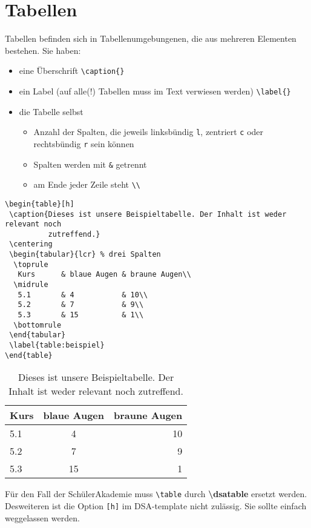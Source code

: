 \section{Tabellen}
Tabellen befinden sich in Tabellenumgebungenen, die
aus mehreren Elementen bestehen. Sie haben:

\begin{itemize}
 \item eine Überschrift \lstinline$\caption{}$
 \item ein Label (auf alle(!) Tabellen muss im Text verwiesen werden)
       \lstinline$\label{}$
 \item die Tabelle selbst
 \begin{itemize}
  \item Anzahl der Spalten, die jeweils linksbündig \lstinline$l$, zentriert
        \lstinline$c$ oder rechtsbündig \lstinline$r$ sein können
  \item Spalten werden mit \lstinline$&$ getrennt
  \item am Ende jeder Zeile steht \lstinline$\\$
 \end{itemize}
\end{itemize}

\begin{lstlisting}
\begin{table}[h]
 \caption{Dieses ist unsere Beispieltabelle. Der Inhalt ist weder relevant noch
          zutreffend.}
 \centering
 \begin{tabular}{lcr} % drei Spalten
  \toprule
   Kurs      & blaue Augen & braune Augen\\
  \midrule
   5.1       & 4           & 10\\
   5.2       & 7           & 9\\
   5.3       & 15          & 1\\
  \bottomrule
 \end{tabular}
 \label{table:beispiel}
\end{table}
\end{lstlisting}

\begin{table}[h]
 \caption{Dieses ist unsere Beispieltabelle. Der Inhalt ist weder relevant noch
          zutreffend.}
 \centering
 \begin{tabular}{lcr} %
  \toprule
   Kurs      & blaue Augen & braune Augen\\
  \midrule
   5.1       & 4           & 10\\
   5.2       & 7           & 9\\
   5.3       & 15          & 1\\
  \bottomrule
 \end{tabular}
 \label{table:beispiel}
\end{table}

\danger Für den Fall der SchülerAkademie muss \lstinline$\table$ durch
        \textbf{\textbackslash dsatable} ersetzt werden. Desweiteren ist die
        Option \lstinline$[h]$ im DSA-template nicht zulässig. Sie sollte
        einfach weggelassen werden.
